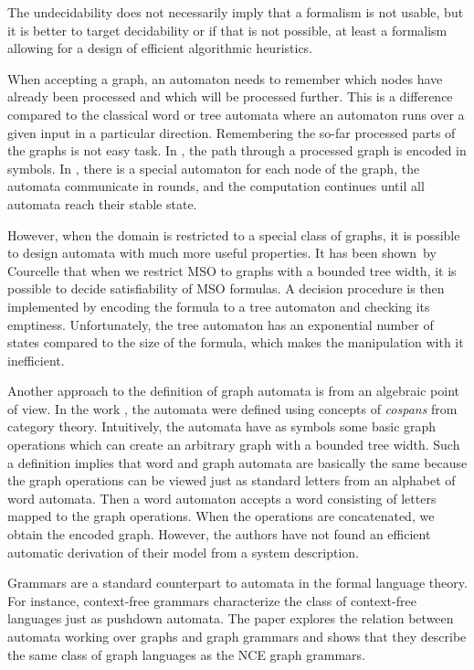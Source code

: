 	The undecidability does not necessarily imply that a formalism is not usable, but
        it is better to target decidability or if that is not possible, at least a formalism allowing
        for a design of efficient algorithmic heuristics.

	When accepting a graph, an automaton needs to remember which nodes have already been
	processed and which will be processed further.
	This is a difference compared to the classical word or tree automata where an automaton runs over
	a given input in a particular direction.
	Remembering the so-far processed parts of the graphs is not easy task.
	In \cite{Thomas:automata}, the path through a processed graph is encoded in symbols.
	In \cite{soa-reiter15}, there is a special automaton for each node of the graph, the automata
	communicate in rounds, and the computation continues until all automata reach their stable state.

	However, when the domain is restricted to a special class of graphs, it is possible to design
	automata with much more useful properties.
	It has been shown~by Courcelle \cite{courcell_graph_2012} that when we restrict MSO to graphs 
	with a bounded tree width, it is possible to decide satisfiability of MSO formulas.
	A decision procedure is then implemented by encoding the formula to a tree automaton
	and checking its emptiness.
	Unfortunately, the tree automaton has an exponential number of states
	compared to the size of the formula, which makes the manipulation with it inefficient.

	Another approach to the definition of graph automata is from an algebraic point of view.
	In the work \cite{soa-blume:2012}, the automata were defined using concepts
	of \emph{cospans} from category theory.
	Intuitively, the automata have as symbols some basic graph operations which can create
	an arbitrary graph with a bounded tree width.
	Such a definition implies that word and graph automata are basically the same
	because the graph operations can be viewed just as standard letters from an alphabet of word automata.
	Then a word automaton accepts a word consisting of letters mapped to the graph operations.
	When the operations are concatenated, we obtain the encoded graph.
	However, the authors have not found an efficient automatic derivation of their model
	from a system description.

	Grammars are a standard counterpart to automata in the formal language theory.
	For instance, context-free grammars characterize the class of context-free languages just
	as pushdown automata.
	The paper \cite{soa-brandenburg05} explores the relation between automata working over
	graphs and graph grammars and shows that they describe the same class of graph languages as
	the NCE graph grammars.
	

